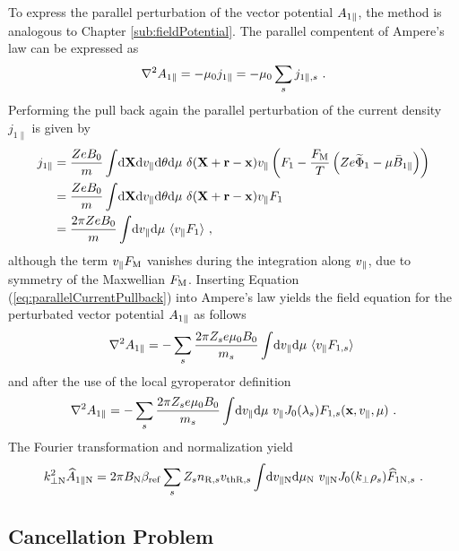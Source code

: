 To express the parallel perturbation of the vector potential $A_{1\parallel}$, the method is analogous to Chapter \ref{sub:fieldPotential}. The parallel compentent of Ampere's law can be expressed as
\begin{gather}
	\nabla^2 A_{1\parallel} = - \mu_0 j_{1\parallel} = - \mu_0 \sum_s j_{1\parallel,s}~.
	\label{eq:parallelAmpereLaw}
\end{gather}
Performing the pull back again the parallel perturbation of the current density $j_{1\parallel}$ is given by
\begin{gather}
	\begin{aligned}
		j_{1\parallel} &= \frac{Ze B_0}{m} \int \! \mathrm{d}\boldsymbol{\mathbf{X}}\mathrm{d}v_\parallel\mathrm{d}\theta\mathrm{d}\mu ~ \delta(\boldsymbol{\mathbf{X}} + \boldsymbol{\mathbf{r}} - \boldsymbol{\mathbf{x}}) v_\parallel \left(F_1 - \frac{F_\mathrm{M}}{T}\left(Ze \widetilde{\Phi}_1 - \mu \bar{B}_{1\parallel}\right) \right)\\
					   &= \frac{Ze B_0}{m} \int \! \mathrm{d}\boldsymbol{\mathbf{X}}\mathrm{d}v_\parallel\mathrm{d}\theta\mathrm{d}\mu ~ \delta(\boldsymbol{\mathbf{X}} + \boldsymbol{\mathbf{r}} - \boldsymbol{\mathbf{x}}) v_\parallel F_1 \\
					   &= \frac{2\pi Ze B_0}{m} \int \! \mathrm{d}v_\parallel\mathrm{d}\mu ~ \langle v_\parallel F_1\rangle~,
	\end{aligned}
	\label{eq:parallelCurrentPullback}
\end{gather}
although the term $v_\parallel F_\mathrm{M}$ vanishes during the integration along $v_\parallel$, due to symmetry of the Maxwellian $F_\mathrm{M}$. 
Inserting Equation (\ref{eq:parallelCurrentPullback}) into Ampere's law yields the field equation for the perturbated vector potential $A_{1\parallel}$ as follows
\begin{gather}
	\nabla^2 A_{1\parallel} = - \sum_s \frac{2\pi Z_se \mu_0 B_0}{m_s}  \int \! \mathrm{d}v_\parallel\mathrm{d}\mu ~ \langle v_\parallel F_{1,s}\rangle~
	\label{eq:fieldInduction}
\end{gather}
and after the use of the local gyroperator definition
\begin{gather}
	\nabla^2 A_{1\parallel} = - \sum_s \frac{2\pi Z_se \mu_0 B_0}{m_s}  \int \! \mathrm{d}v_\parallel\mathrm{d}\mu ~ v_\parallel J_0(\lambda_s) F_{1,s}(\boldsymbol{\mathbf{x}}, v_\parallel, \mu)~.
	\label{eq:fieldInductionLocal}
\end{gather}
The Fourier transformation and normalization yield
\begin{gather}
	k_{\perp \mathrm{N}}^2 \widehat{A}_{1\parallel \mathrm{N}} = 2 \pi B_\mathrm{N} \beta_\mathrm{ref}\sum_s Z_s n_{\mathrm{R},s} v_{\mathrm{th}\mathrm{R},s} \int \! \mathrm{d}v_{\parallel \mathrm{N}}\mathrm{d}\mu_\mathrm{N} ~ v_{\parallel \mathrm{N}} J_0(k_\perp \rho_s) \widehat{F}_{1\mathrm{N},s}~.
	\label{eq:fieldInductionLocalNorm}
\end{gather}
\newpage

\subsection{Cancellation Problem}
\label{sub:cancelProblem}

